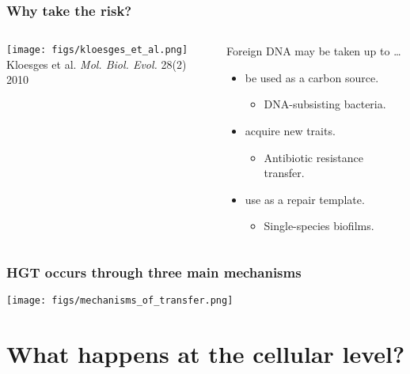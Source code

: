 \begin{frame}[fragile]
\frametitle{Why take the risk?}

\begin{columns}[T]
	\begin{column}{0.48\textwidth}
		\texttt{[image: figs/kloesges\_et\_al.png]}\\
		\tiny{Kloesges et al. \textit{Mol. Biol. Evol.} 28(2) 2010}
	\end{column}
\pause
	\begin{column}{0.48\textwidth}
	Foreign DNA may be taken up to \ldots 
		\begin{itemize}	
			\item be used as a carbon source.
				\vspace{-1em}\begin{itemize}
					\item \tiny{DNA-subsisting bacteria.}
				\end{itemize}
			\item acquire new traits.
				\begin{itemize}
					\item \tiny{Antibiotic resistance transfer.}
				\end{itemize}
			\item use as a repair template.
				\begin{itemize}
					\item \tiny{Single-species biofilms.}
				\end{itemize}
		\end{itemize}
	\end{column}
\end{columns}


\end{frame}

\begin{frame}
	\frametitle{HGT occurs through three main mechanisms}
	\centerline{\texttt{[image: figs/mechanisms\_of\_transfer.png]}}
\end{frame}


\section{What happens at the cellular level?}

